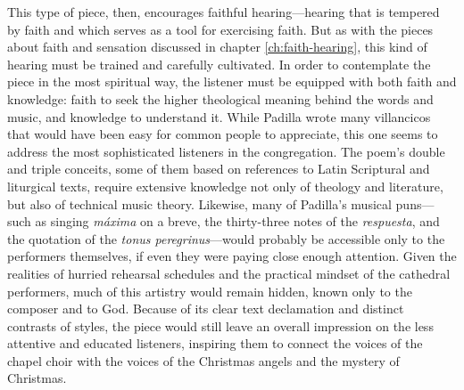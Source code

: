 This type of piece, then, encourages faithful hearing---hearing that is tempered
by faith and which serves as a tool for exercising faith.
But as with the pieces about faith and sensation discussed in chapter
\ref{ch:faith-hearing}, this kind of hearing must be trained and carefully
cultivated. 
In order to contemplate the piece in the most spiritual way, the listener must
be equipped with both faith and knowledge: faith to seek the higher theological
meaning behind the words and music, and knowledge to understand it.
While Padilla wrote many villancicos that would have been easy for common people
to appreciate, this one seems to address the most sophisticated listeners in the
congregation.
The poem's double and triple conceits, some of them based on references to Latin
Scriptural and liturgical texts, require extensive knowledge not only of
theology and literature, but also of technical music theory.
Likewise, many of Padilla's musical puns---such as singing \emph{máxima} on a
breve, the thirty-three notes of the \emph{respuesta}, and the quotation of the
\emph{tonus peregrinus}---would probably be accessible only to the performers
themselves, if even they were paying close enough attention.
Given the realities of hurried rehearsal schedules and the practical mindset of
the cathedral performers, much of this artistry would remain hidden, known only
to the composer and to God.
Because of its clear text declamation and distinct contrasts of styles, the
piece would still leave an overall impression on the less attentive and educated
listeners, inspiring them to connect the voices of the chapel choir with the
voices of the Christmas angels and the mystery of Christmas.

